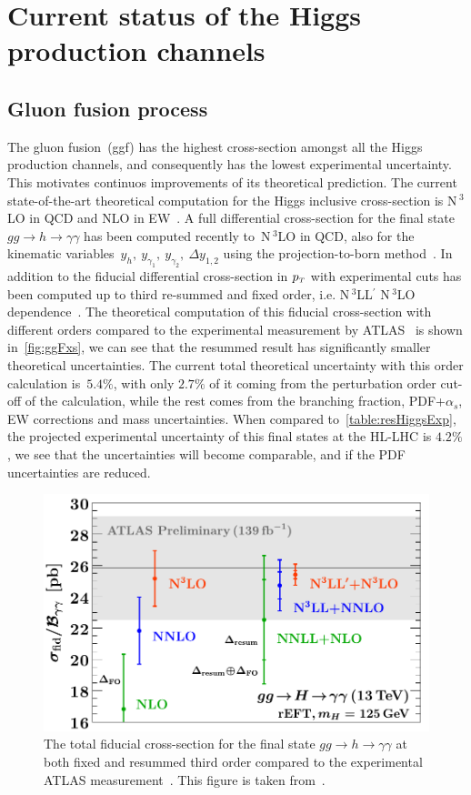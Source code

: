 \section{Current status of the Higgs production channels  \label{sec:singlehiggschannels}  }
\subsection{Gluon fusion process}
The  gluon fusion~(ggf) has the highest cross-section amongst all the Higgs production channels, and consequently has the lowest experimental uncertainty. This motivates continuos improvements of its theoretical prediction.  The current state-of-the-art theoretical computation for the Higgs inclusive cross-section is N$\,^3$LO in QCD and NLO in EW~\cite{Bonetti:2018ukf}. A full differential cross-section for the final state~$ gg \to h \to \gamma \gamma$ has been computed recently to~N$\,^3$LO in QCD, also for the kinematic variables~$y_h, \ y_{\gamma_1},\ y_{\gamma_2},\ \Delta y_{1,2}$ using the projection-to-born method~\cite{Chen:2021isd}. In addition to the fiducial differential cross-section in $p_{\scriptscriptstyle T}$ with experimental cuts has been computed up to third re-summed and fixed order, i.e.  N$\,^3$LL$^\prime$   N$\,^3$LO dependence~\cite{Billis:2021ecs}. The theoretical computation of this fiducial cross-section with different orders compared to the experimental measurement by ATLAS~\cite{ATLAS:2019jst} is shown in~\autoref{fig:ggFxs}, we can see that the resummed result has significantly smaller theoretical uncertainties. The current total theoretical uncertainty with this order calculation is~$5.4 \%$, with only $2.7\%$ of it coming from the perturbation order cut-off of the calculation, while the rest comes from the branching fraction, PDF+$\alpha_s$, EW corrections and mass uncertainties. When compared to~\autoref{table:resHiggsExp}, the projected experimental uncertainty of this final states at the HL-LHC is $4.2\%$, we see that the uncertainties will become comparable, and if the PDF uncertainties are reduced.
\begin{figure}[htbp!]
	\begin{center}
		\includegraphics[width=.7\textwidth]{figures/total_xs_fid}
		\caption{ The total fiducial cross-section for the final state  $ gg \to h \to \gamma \gamma$ at both fixed and resummed third order compared to the experimental ATLAS measurement~\cite{ATLAS:2019jst}. This figure is taken from~\cite{Billis:2021ecs}. \label{fig:ggFxs} }
	\end{center}
\end{figure}
